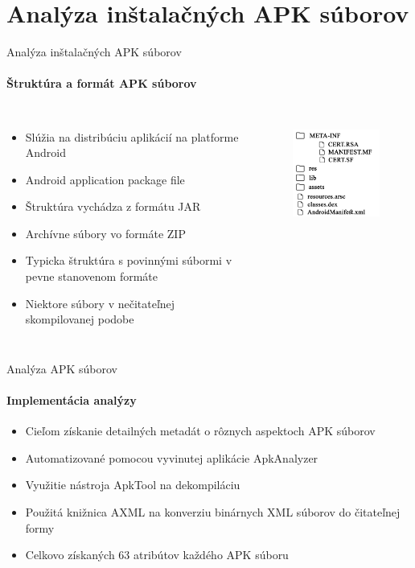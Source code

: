 \documentclass{beamer}
\begin{document}

\section{Analýza inštalačných APK súborov}
  \begin{frame}[label=lists]{Analýza inštalačných APK súborov}
   \framesubtitle{Štruktúra a formát APK súborov}
    \begin{columns}
       \begin{itemize}
		\item Slúžia na distribúciu aplikácií na platforme Android
		\item Android application package file	
		\item Štruktúra vychádza z formátu JAR
		\item Archívne súbory vo formáte ZIP
		\item Typicka štruktúra s povinnými súbormi v pevne stanovenom formáte
		\item Niektore súbory v nečitateľnej skompilovanej podobe
	\end{itemize}	  
        	 \begin{figure}[htb]
    \includegraphics[width=45mm]{images/apkStructure.pdf}
  \label{fig:strukturaApk}
\end{figure}
    \end{columns}
    
   \end{frame} 
    
  \begin{frame}[label=lists]{Analýza APK súborov}
  \framesubtitle{Implementácia analýzy}
	\begin{itemize}
		\item Cieľom získanie detailných metadát o rôznych aspektoch APK súborov
		\item Automatizované pomocou vyvinutej aplikácie ApkAnalyzer\cite{apkanalyzer}
		\item Využitie nástroja ApkTool na dekompiláciu \cite{apktool}
		\item Použitá knižnica AXML na konverziu binárnych XML súborov do čitateľnej formy \cite{axml}
		\item Celkovo získaných 63 atribútov každého APK súboru
	\end{itemize}	    
   \end{frame} 
   
\end{document}
